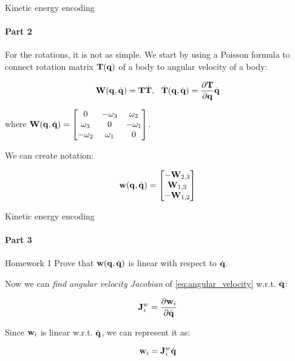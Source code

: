 \documentclass{beamer}
\begin{document}
\begin{frame}{Kinetic energy encoding}
	\framesubtitle{Part 2}
	\begin{flushleft}
		
		For the rotations, it is not as simple. We start by using a Poisson formula to connect rotation matrix $\mathbf{T}(\mathbf{q})$ of a body to angular velocity of a body:
		
		\begin{equation}
			\mathbf{W}(\mathbf{q}, \dot{\mathbf{q}}) = \mathbf{T} \dot{\mathbf{T}}, \ \ \dot{\mathbf{T}}(\mathbf{q}, \dot{\mathbf{q}}) = \frac{\partial \mathbf{T}}{\partial {\mathbf{q}}} \dot{\mathbf{q}}
		\end{equation}
		
		where $\mathbf{W}(\mathbf{q}, \dot{\mathbf{q}}) = 
		\begin{bmatrix}  0         & -\omega_3 &  \omega_2  \\
			\omega_3  & 0         & -\omega_1 \\
			-\omega_2  & \omega_1  &  0
		\end{bmatrix}$.
		
		We can create notation:
		
		\begin{equation}
			\label{eq:angular_velocity}
			\mathbf{w}(\mathbf{q}, \dot{\mathbf{q}}) = 
			\begin{bmatrix}  
				-\mathbf{W}_{2, 3} \\ 
				\mathbf{W}_{1, 3} \\ 
				-\mathbf{W}_{1, 2}
			\end{bmatrix}
		\end{equation}
		
	\end{flushleft}
\end{frame}





\begin{frame}{Kinetic energy encoding}
	\framesubtitle{Part 3}
	\begin{flushleft}
		
		
		\begin{block}{Homework 1}
			Prove that $\mathbf{w}(\mathbf{q}, \dot{\mathbf{q}})$ is linear with respect to $\dot{\mathbf{q}}$.
		\end{block}
		
		Now we can \emph{find angular velocity Jacobian} of \eqref{eq:angular_velocity} w.r.t. $\dot{\mathbf{q}}$:
		
		\begin{equation}
			\label{eq:angular_velocity_jacobian}
			\mathbf{J}^w_i = \frac{\partial \mathbf{w}_i }{\partial \dot{\mathbf{q}}}
		\end{equation}
		
		Since $\mathbf{w}_i$ is linear w.r.t. $\dot{\mathbf{q}}$, we can represent it as:
		
		\begin{equation}
			\mathbf{w}_i  = \mathbf{J}^w_i \dot{\mathbf{q}}
		\end{equation}
		
		
	\end{flushleft}
\end{frame}
\end{document}
